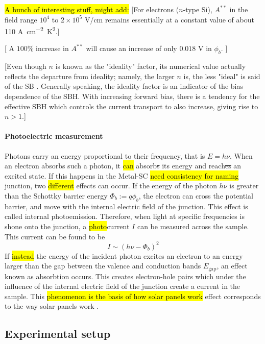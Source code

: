 \hl{A bunch of interesting stuff, might add:}
[For electrons ($n$-type Si), $A^{**}$ in the field range $10^4$ to $2\times 10^5$ V/cm remains essentially at a constant value of about 110 \unit{A cm^{-2} K^2}.]

[ A $100 \%$ increase in $A^{**}$ will cause an increase of only $0.018$ V in $\phi_b$. ]


[Even though $n$ is known as the  "ideality" factor, its numerical value actually reflects the departure from ideality; namely, the larger $n$ is, the less "ideal" is said of the SB \cite{tung_recent_2001}.
Generally speaking, the ideality factor is an indicator of the bias dependence of the SBH. With increasing forward bias, there is a tendency for the effective SBH which controls the current transport to also increase, giving rise to $n > 1$.]


\paragraph{Photoelectric measurement}
Photons carry an energy proportional to their frequency, that is $E = h \nu$.
When an electron absorbs such a photon, it \hl{can} absorb\st{s} its energy and reach\st{es} an excited state.
If this happens in the Metal-SC \hl{need consistency for naming} junction, two \hl{different} effects can occur.
If the energy of the photon $h\nu$ is greater than the Schottky barrier energy $\Phi_b := q\phi_b$, the electron can cross the potential barrier, and move with the internal electric field of the junction.
This effect is called internal photoemission.
Therefore, when light at specific frequencies is shone onto the junction, a \hl{photo}current $I$ can be measured across the sample.
This current can be found to be \cite{notice}
\begin{equation}
    I \sim (h \nu - \Phi_b)^2
    \label{eq:fowler}
\end{equation}
If \hl{instead} the energy of the incident photon excites an electron to an energy larger than the gap between the valence and conduction bands $E_\textrm{gap}$, an effect known as absorbtion occurs.
This creates electron-hole pairs which under the influence of the internal electric field of the junction create a current in the sample.
This \hl{phenomenon is the basis of how solar panels work} effect corresponds to the way solar panels work \cite{notice}.

\subsection{Experimental setup}
